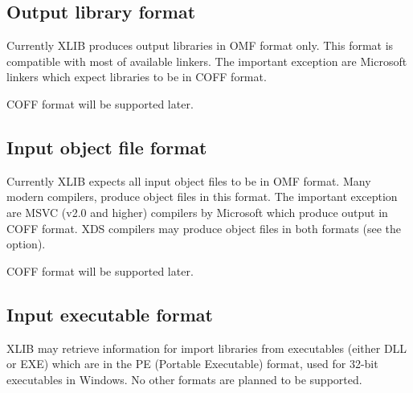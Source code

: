 \subsection{Output library format}

Currently XLIB produces output libraries in OMF format only.
This format is compatible with most of available linkers. The
important exception are Microsoft linkers which expect
libraries to be in COFF format.

COFF format will be supported later.

\subsection{Input object file format}

Currently XLIB expects all input object files to be in OMF
format. Many modern compilers, produce object files in this format.
The important exception are MSVC (v2.0 and higher) compilers
by Microsoft which produce output in COFF format.
XDS compilers may produce object files in both formats
(see the  option).

COFF format will be supported later.

\subsection{Input executable format}

XLIB may retrieve information for import libraries
from executables (either DLL or EXE) which are in the PE (Portable
Executable) format, used for 32-bit executables in Windows.
No other formats are planned to be supported.

